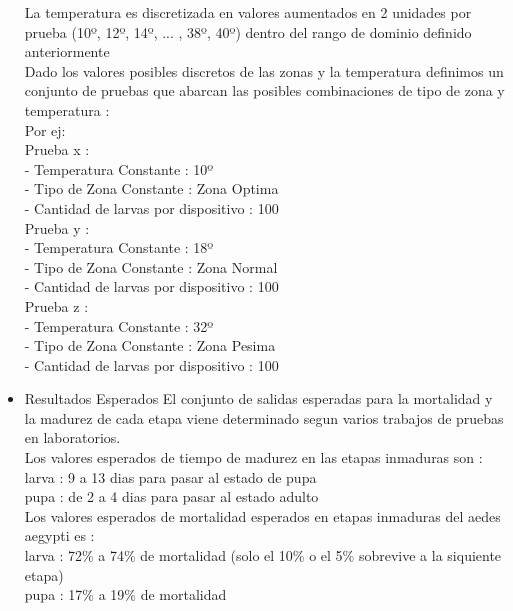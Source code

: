 \begin{itemize}
La temperatura es discretizada en valores aumentados en 2 unidades por 
prueba (10º, 12º, 14º, ... , 38º, 40º) dentro del rango de dominio definido
anteriormente \\

Dado los valores posibles discretos de las zonas y la temperatura definimos
un conjunto de pruebas que abarcan las posibles combinaciones de tipo 
de zona y temperatura : \\

Por ej: \\

Prueba x : \\
	- Temperatura Constante : 10º\\
	- Tipo de Zona Constante : Zona Optima\\
	- Cantidad de larvas por dispositivo : 100\\

Prueba y :\\
	- Temperatura Constante : 18º\\
	- Tipo de Zona Constante : Zona Normal\\
	- Cantidad de larvas por dispositivo : 100 \\

Prueba z : \\
	- Temperatura Constante : 32º \\
	- Tipo de Zona Constante : Zona Pesima\\
	- Cantidad de larvas por dispositivo : 100\\


\item Resultados Esperados 
El conjunto de salidas esperadas para la mortalidad y la madurez de cada
etapa viene determinado segun varios trabajos de pruebas en laboratorios. \\ 

Los valores esperados de tiempo de madurez en las etapas inmaduras son :\\
larva : 9 a 13 dias para pasar al estado de pupa\\
pupa : de 2 a 4 dias para pasar al estado adulto\\

Los valores esperados de mortalidad esperados en etapas inmaduras del
aedes aegypti es :\\
larva : 72\% a 74\% de mortalidad (solo el 10\% o el 5\% sobrevive a la siquiente
etapa)\\
pupa : 17\% a 19\% de mortalidad  \\


\end{itemize}
